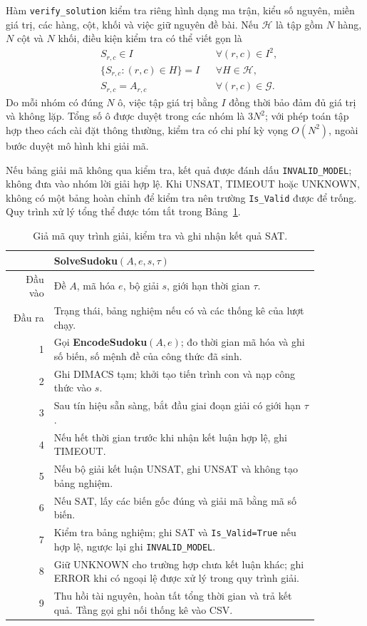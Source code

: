 \documentclass[a4paper,fleqn]{cas-sc}
\begin{document}
Hàm \texttt{verify\_solution} kiểm tra riêng hình dạng ma trận, kiểu
số nguyên, miền giá trị, các hàng, cột, khối và việc giữ nguyên đề bài.
Nếu $\mathcal{H}$ là tập gồm $N$ hàng, $N$ cột và $N$ khối, điều kiện
kiểm tra có thể viết gọn là
\begin{align}
 &S_{r,c}\in I &&\forall(r,c)\in I^2,\nonumber\\
 &\{S_{r,c}:(r,c)\in H\}=I &&\forall H\in\mathcal{H},
 \label{eq:method-verification}\\
 &S_{r,c}=A_{r,c} &&\forall(r,c)\in\mathcal{G}.\nonumber
\end{align}
Do mỗi nhóm có đúng $N$ ô, việc tập giá trị bằng $I$ đồng thời bảo đảm
đủ giá trị và không lặp. Tổng số ô được duyệt trong các nhóm là $3N^2$;
với phép toán tập hợp theo cách cài đặt thông thường, kiểm tra có chi
phí kỳ vọng $O(N^2)$, ngoài bước duyệt mô hình khi giải mã.

Nếu bảng giải mã không qua kiểm tra, kết quả được đánh dấu
\texttt{INVALID\_MODEL}; không đưa vào nhóm lời giải hợp lệ.
Khi UNSAT, TIMEOUT hoặc UNKNOWN, không có một bảng hoàn chỉnh để kiểm
tra nên trường \texttt{Is\_Valid} được để trống.
Quy trình xử lý tổng thể được tóm tắt trong
Bảng~\ref{tab:method-solving-algorithm}.

\begin{table}[pos=htbp]
 \centering
 \caption{Giả mã quy trình giải, kiểm tra và ghi nhận kết quả SAT.}
 \label{tab:method-solving-algorithm}
 \begin{tabular}{rp{0.86\linewidth}}
  \toprule
  & \textbf{SolveSudoku}$(A,e,s,\tau)$ \\
  \midrule
  Đầu vào & Đề $A$, mã hóa $e$, bộ giải $s$, giới hạn thời gian $\tau$. \\
  Đầu ra & Trạng thái, bảng nghiệm nếu có và các thống kê của lượt chạy. \\
  1 & Gọi \textbf{EncodeSudoku}$(A,e)$; đo thời gian mã hóa và ghi số
      biến, số mệnh đề của công thức đã sinh. \\
  2 & Ghi DIMACS tạm; khởi tạo tiến trình con và nạp công thức vào $s$. \\
  3 & Sau tín hiệu sẵn sàng, bắt đầu giai đoạn giải có giới hạn $\tau$. \\
  4 & Nếu hết thời gian trước khi nhận kết luận hợp lệ, ghi TIMEOUT. \\
  5 & Nếu bộ giải kết luận UNSAT, ghi UNSAT và không tạo bảng nghiệm. \\
  6 & Nếu SAT, lấy các biến gốc đúng và giải mã bằng mã số biến. \\
  7 & Kiểm tra bảng nghiệm; ghi SAT và \texttt{Is\_Valid=True} nếu
      hợp lệ, ngược lại ghi \texttt{INVALID\_MODEL}. \\
  8 & Giữ UNKNOWN cho trường hợp chưa kết luận khác; ghi ERROR khi có
      ngoại lệ được xử lý trong quy trình giải. \\
  9 & Thu hồi tài nguyên, hoàn tất tổng thời gian và trả kết quả.
      Tầng gọi ghi nối thống kê vào CSV. \\
  \bottomrule
 \end{tabular}
\end{table}
\end{document}
